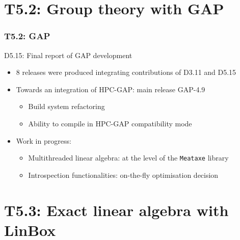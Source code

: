 \documentclass{beamer}
\begin{document}
\section{T5.2: Group theory with GAP}
\begin{frame}
  \frametitle{T5.2: GAP}
  \begin{block} {D5.15: Final report of GAP development}
    \begin{itemize}
    \item 8 releases were produced integrating contributions of D3.11 and D5.15
    \item Towards an integration of HPC-GAP: main release GAP-4.9
      \begin{itemize}
      \item Build system refactoring
      \item Ability to compile in HPC-GAP compatibility mode
      \end{itemize}
    \item Work in progress:
      \begin{itemize}
      \item  Multithreaded linear algebra: at the level of the \texttt{Meataxe} library
      \item Introspection functionalities: on-the-fly optimisation decision
      \end{itemize}
    \end{itemize}
  \end{block}
\end{frame}


\section{T5.3: Exact linear algebra with LinBox}
\end{document}
